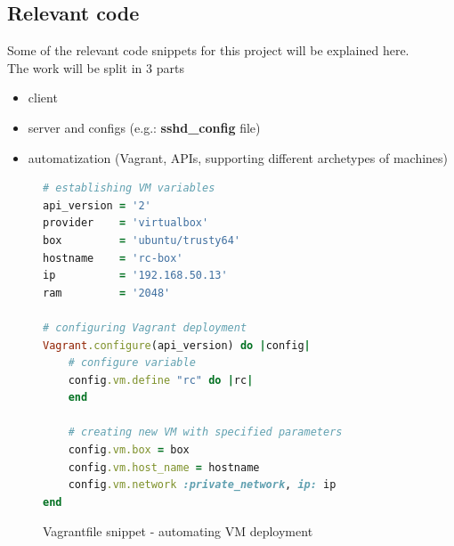 \documentclass{llncs}
\begin{document}
\fi %

\subsection{Relevant code}

\iffalse %

Some of the relevant code snippets for this project will be explained here.\\

The work will be split in 3 parts
\begin{itemize}
	\item client
    \item server and configs (e.g.: \textbf{sshd\_config} file)
    \item automatization (Vagrant, APIs, supporting different archetypes of machines)
\end{itemize}

\begin{figure}
\begin{lstlisting}[language=Ruby]
# establishing VM variables
api_version = '2'
provider    = 'virtualbox'
box         = 'ubuntu/trusty64'
hostname    = 'rc-box'
ip          = '192.168.50.13'
ram         = '2048'

# configuring Vagrant deployment
Vagrant.configure(api_version) do |config|
  	# configure variable
  	config.vm.define "rc" do |rc|
	end

	# creating new VM with specified parameters
	config.vm.box = box
	config.vm.host_name = hostname
	config.vm.network :private_network, ip: ip
end
\end{lstlisting}
	\centering
	\caption{Vagrantfile snippet - automating VM deployment}
\end{figure}
\end{document}
